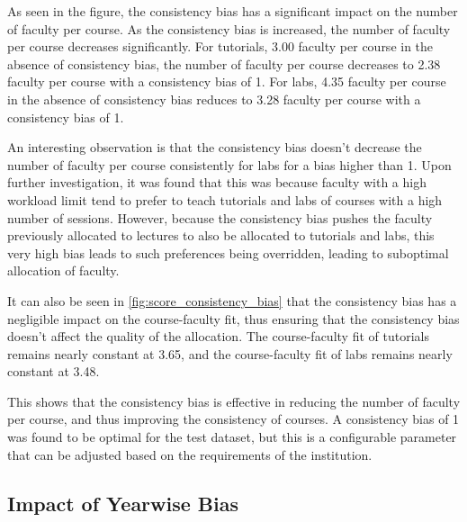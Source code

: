As seen in the figure, the consistency bias has a significant impact on the number of faculty per course. As the consistency bias is increased, the number of faculty per course decreases significantly. For tutorials, 3.00 faculty per course in the absence of consistency bias, the number of faculty per course decreases to 2.38 faculty per course with a consistency bias of 1. For labs, 4.35 faculty per course in the absence of consistency bias reduces to 3.28 faculty per course with a consistency bias of 1.

An interesting observation is that the consistency bias doesn't decrease the number of faculty per course consistently for labs for a bias higher than 1. Upon further investigation, it was found that this was because faculty with a high workload limit tend to prefer to teach tutorials and labs of courses with a high number of sessions. However, because the consistency bias pushes the faculty previously allocated to lectures to also be allocated to tutorials and labs, this very high bias leads to such preferences being overridden, leading to suboptimal allocation of faculty.

It can also be seen in \autoref{fig:score_consistency_bias} that the consistency bias has a negligible impact on the course-faculty fit, thus ensuring that the consistency bias doesn't affect the quality of the allocation. The course-faculty fit of tutorials remains nearly constant at 3.65, and the course-faculty fit of labs remains nearly constant at 3.48.

This shows that the consistency bias is effective in reducing the number of faculty per course, and thus improving the consistency of courses. A consistency bias of 1 was found to be optimal for the test dataset, but this is a configurable parameter that can be adjusted based on the requirements of the institution.

\subsection{Impact of Yearwise Bias}

